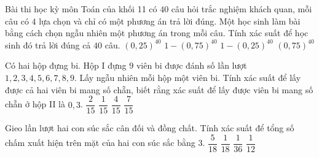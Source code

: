 \begin{ex}%
	Bài thi học kỳ môn Toán của khối 11 có $40$ câu hỏi trắc nghiệm khách quan, mỗi câu có $4$ lựa chọn và chỉ có một phương án trả lời đúng. Một học sinh làm bài bằng cách chọn ngẫu nhiên một phương án trong mỗi câu. Tính xác suất để học sinh đó trả lời đúng cả $40$ câu.
	\choice
	{\True $(0{,}25)^{40}$}
	{$1-(0{,}75)^{40}$}
	{$1-(0{,}25)^{40}$}
	{$(0{,}75)^{40}$}
\end{ex}

\begin{ex}%
	Có hai hộp đựng bi. Hộp I đựng $9$ viên bi được đánh số lần lượt $1, 2, 3, 4, 5, 6, 7, 8, 9$. Lấy ngẫu nhiên mỗi hộp một viên bi. Tính xác suất để lấy được cả hai viên bi mang số chẵn, biết rằng xác suất để lấy được viên bi mang số chẵn ở hộp II là $0{,}3$.
	\choice
	{\True $\dfrac{2}{15}$}
	{$\dfrac{1}{15}$}
	{$\dfrac{4}{15}$}
	{$\dfrac{7}{15}$}
\end{ex}

\begin{ex}%
	Gieo lần lượt hai con súc sắc cân đối và đồng chất. Tính xác suất để tổng số chấm xuất hiện trên mặt của hai con súc sắc bằng $3$.
	\choice
	{$\dfrac{5}{18}$}
	{\True $\dfrac{1}{18}$}
	{$\dfrac{1}{36}$}
	{$\dfrac{1}{12}$}
\end{ex}

